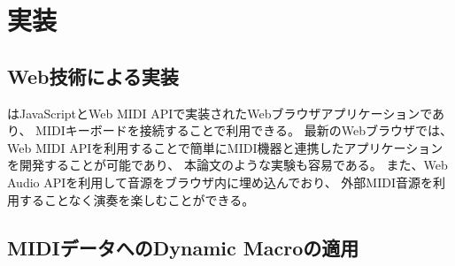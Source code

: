 \section{実装}

\subsection{Web技術による実装}

{\system}はJavaScriptとWeb MIDI API\cite{webmidi}で実装されたWebブラウザアプリケーションであり、
MIDIキーボードを接続することで利用できる。
最新のWebブラウザでは、
Web MIDI APIを利用することで簡単にMIDI機器と連携したアプリケーションを開発することが可能であり、
本論文のような実験も容易である。
また、Web Audio API\cite{webaudio}を利用して音源をブラウザ内に埋め込んでおり、
外部MIDI音源を利用することなく演奏を楽しむことができる。

\subsection{MIDIデータへのDynamic Macroの適用}

